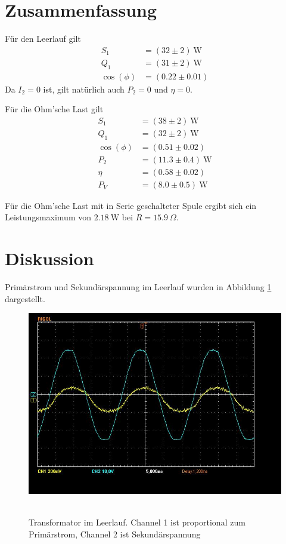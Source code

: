 \documentclass{article}
\newcommand{\W}{\text{W}}
\begin{document}
\section{Zusammenfassung}

Für den Leerlauf gilt
\begin{align*}
S_1 &= (32 \pm 2)~\W \\
Q_1 &= (31 \pm 2)~\W \\
\cos(\phi) &= (0.22 \pm 0.01)
\end{align*}
Da $I_2=0$ ist, gilt natürlich auch $P_2=0$ und $\eta = 0$.


Für die Ohm'sche Last gilt
\begin{align*}
S_1 &= (38 \pm 2)~\W \\
Q_1 &= (32 \pm 2)~\W \\
\cos(\phi) &= (0.51 \pm 0.02) \\
P_2 &= (11.3 \pm 0.4)~\W \\
\eta &= (0.58 \pm 0.02) \\
P_V &= (8.0 \pm 0.5)~\W
\end{align*}


Für die Ohm'sche Last mit in Serie geschalteter Spule ergibt sich ein Leistungsmaximum von $2.18~\W$ bei $R=15.9~\Omega$.

\section{Diskussion}


Primärstrom und Sekundärspannung im Leerlauf wurden in Abbildung \ref{fig:task1} dargestellt.


\begin{figure}[H]
\caption{Transformator im Leerlauf. Channel 1 ist proportional zum Primärstrom, Channel 2 ist Sekundärspannung}
\label{fig:task1}
{\centering
\includegraphics[scale=0.4]{task1.jpg}
~
}
\end{figure}
\end{document}
